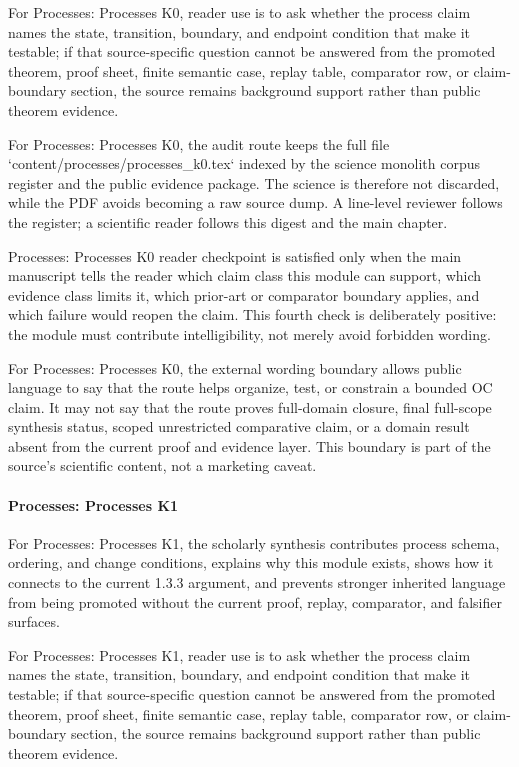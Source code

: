 For Processes: Processes K0, reader use is to ask whether the process claim names the state, transition, boundary, and endpoint condition that make it testable; if that source-specific question cannot be answered from the promoted theorem, proof sheet, finite semantic case, replay table, comparator row, or claim-boundary section, the source remains background support rather than public theorem evidence.


For Processes: Processes K0, the audit route keeps the full file `content/processes/processes\_k0.tex` indexed by the science monolith corpus register and the public evidence package. The science is therefore not discarded, while the PDF avoids becoming a raw source dump. A line-level reviewer follows the register; a scientific reader follows this digest and the main chapter.


Processes: Processes K0 reader checkpoint is satisfied only when the main manuscript tells the reader which claim class this module can support, which evidence class limits it, which prior-art or comparator boundary applies, and which failure would reopen the claim. This fourth check is deliberately positive: the module must contribute intelligibility, not merely avoid forbidden wording.


For Processes: Processes K0, the external wording boundary allows public language to say that the route helps organize, test, or constrain a bounded OC claim. It may not say that the route proves full-domain closure, final full-scope synthesis status, scoped unrestricted comparative claim, or a domain result absent from the current proof and evidence layer. This boundary is part of the source's scientific content, not a marketing caveat.


\paragraph{Processes: Processes K1}

For Processes: Processes K1, the scholarly synthesis contributes process schema, ordering, and change conditions, explains why this module exists, shows how it connects to the current 1.3.3 argument, and prevents stronger inherited language from being promoted without the current proof, replay, comparator, and falsifier surfaces.


For Processes: Processes K1, reader use is to ask whether the process claim names the state, transition, boundary, and endpoint condition that make it testable; if that source-specific question cannot be answered from the promoted theorem, proof sheet, finite semantic case, replay table, comparator row, or claim-boundary section, the source remains background support rather than public theorem evidence.


